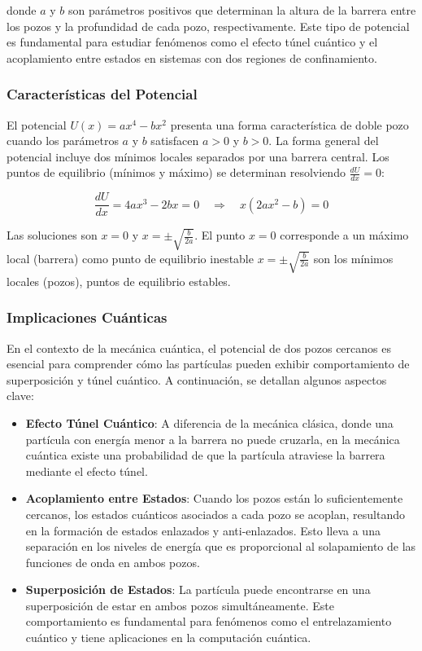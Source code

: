 \documentclass[a4paper,12pt]{article}
\begin{document}
donde \( a \) y \( b \) son parámetros positivos que determinan la altura de la barrera entre los pozos y la profundidad de cada pozo, respectivamente. Este tipo de potencial es fundamental para estudiar fenómenos como el efecto túnel cuántico y el acoplamiento entre estados en sistemas con dos regiones de confinamiento.

\subsubsection{Características del Potencial}

El potencial \( U(x) = a x^4 - b x^2 \) presenta una forma característica de doble pozo cuando los parámetros \( a \) y \( b \) satisfacen \( a > 0 \) y \( b > 0 \). La forma general del potencial incluye dos mínimos locales separados por una barrera central. Los puntos de equilibrio (mínimos y máximo) se determinan resolviendo \( \frac{dU}{dx} = 0 \):

\begin{equation}
    \frac{dU}{dx} = 4a x^3 - 2b x = 0 \quad \Rightarrow \quad x(2a x^2 - b) = 0
\end{equation}

Las soluciones son \( x = 0 \) y \( x = \pm \sqrt{\frac{b}{2a}} \). El punto \( x = 0 \) corresponde a un máximo local (barrera) como punto de equilibrio inestable \( x = \pm \sqrt{\frac{b}{2a}} \) son los mínimos locales (pozos), puntos de equilibrio estables.

\subsubsection{Implicaciones Cuánticas}

En el contexto de la mecánica cuántica, el potencial de dos pozos cercanos es esencial para comprender cómo las partículas pueden exhibir comportamiento de superposición y túnel cuántico. A continuación, se detallan algunos aspectos clave:

\begin{itemize}
    \item \textbf{Efecto Túnel Cuántico}: A diferencia de la mecánica clásica, donde una partícula con energía menor a la barrera no puede cruzarla, en la mecánica cuántica existe una probabilidad de que la partícula atraviese la barrera mediante el efecto túnel.
    
    \item \textbf{Acoplamiento entre Estados}: Cuando los pozos están lo suficientemente cercanos, los estados cuánticos asociados a cada pozo se acoplan, resultando en la formación de estados enlazados y anti-enlazados. Esto lleva a una separación en los niveles de energía que es proporcional al solapamiento de las funciones de onda en ambos pozos.
    
    \item \textbf{Superposición de Estados}: La partícula puede encontrarse en una superposición de estar en ambos pozos simultáneamente. Este comportamiento es fundamental para fenómenos como el entrelazamiento cuántico y tiene aplicaciones en la computación cuántica.
\end{itemize}
\end{document}
